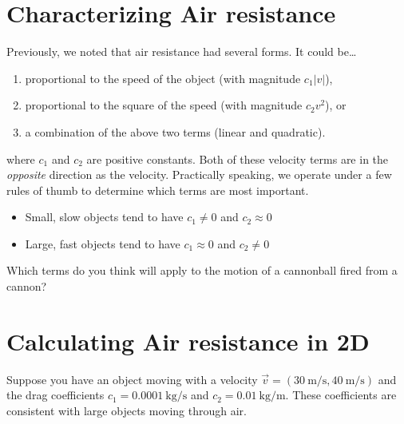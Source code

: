 \documentclass[12pt,hidelinks]{article}
\begin{document}
\section{Characterizing Air resistance}

Previously, we noted that air resistance had several forms. It could be\ldots
\begin{enumerate}[label=(\roman*)]
  \item proportional to the speed of the object (with magnitude $c_1\left|v\right|$),
  \item proportional to the square of the speed (with magnitude $c_2v^2$), or
  \item a combination of the above two terms (linear and quadratic).
\end{enumerate}
where $c_1$ and $c_2$ are positive constants. Both of these velocity terms are in the
\textit{opposite} direction as the velocity.  Practically speaking, we operate under a few
rules of thumb to determine which terms are most important.
\begin{itemize}
  \item Small, slow objects tend to have $c_1 \neq 0$ and $c_2 \approx 0$
  \item Large, fast objects tend to have $c_1 \approx 0$ and $c_2 \neq 0$
\end{itemize}

Which terms do you think will apply to the motion of a cannonball fired from a cannon?
\vspace{0.5in}

\section{Calculating Air resistance in 2D}

Suppose you have an object moving with a velocity
$\vec{v} = (\SI{30}{\meter\per\second}, \SI{40}{\meter\per\second})$ and the drag coefficients
$c_1 = \SI{0.0001}{\kilo\gram\per\second}$ and $c_2 = \SI{0.01}{\kilo\gram\per\meter}$. These
coefficients are consistent with large objects moving through air.
\end{document}
